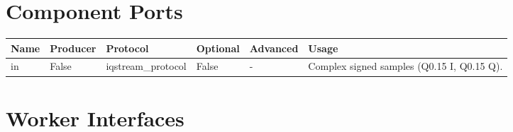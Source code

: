 \documentclass{article}
\begin{document}
\begin{landscape}
	\section*{Component Ports}
	\begin{scriptsize}
		\begin{tabular}{|p{2cm}|p{1.5cm}|p{4cm}|p{1.5cm}|p{1.5cm}|p{10.75cm}|}
			\hline
			\rowcolor{blue}
			Name & Producer & Protocol           & Optional & Advanced & Usage                  \\
			\hline
			in   & False    & iqstream\_protocol & False     & -        & Complex signed samples (Q0.15 I, Q0.15 Q). \\
			\hline
		\end{tabular}
	\end{scriptsize}

	\section*{Worker Interfaces}

\end{landscape}
\end{document}
